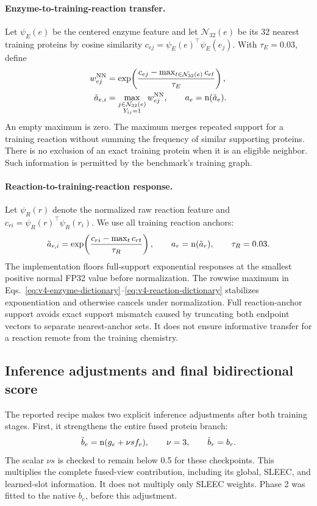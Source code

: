 \paragraph{Enzyme-to-training-reaction transfer.}
Let $\psi_E(e)$ be the centered enzyme feature and let $\mathcal N_{32}(e)$
be its 32 nearest training proteins by cosine similarity
$c_{ej}=\psi_E(e)^\top\psi_E(e_j)$. With $\tau_E=0.03$, define
\begin{align}
  w_{ej}^{\mathrm{NN}}&=
    \exp\!\left(\frac{c_{ej}-\max_{t\in\mathcal N_{32}(e)}c_{et}}{\tau_E}\right),\\
  \tilde a_{e,i}&=
    \max_{\substack{j\in\mathcal N_{32}(e)\\Y_{ij}=1}}w_{ej}^{\mathrm{NN}},
  \qquad a_e=\operatorname{n}(\tilde a_e).
  \label{eq:v4-enzyme-dictionary}
\end{align}
An empty maximum is zero. The maximum merges repeated support for a training
reaction without summing the frequency of similar supporting proteins.
There is no exclusion of an exact training protein when it is an eligible
neighbor. Such information is permitted by the benchmark's training graph.

\paragraph{Reaction-to-training-reaction response.}
Let $\psi_R(r)$ denote the normalized raw reaction feature and
$c_{ri}=\psi_R(r)^\top\psi_R(r_i)$. We use all training reaction anchors:
\begin{equation}
  \tilde a_{r,i}=\exp\!\left(
       \frac{c_{ri}-\max_t c_{rt}}{\tau_R}\right),\qquad
  a_r=\operatorname{n}(\tilde a_r),\qquad \tau_R=0.03.
  \label{eq:v4-reaction-dictionary}
\end{equation}
The implementation floors full-support exponential responses at the smallest
positive normal FP32 value before normalization. The rowwise maximum in
Eqs.~\eqref{eq:v4-enzyme-dictionary}--\eqref{eq:v4-reaction-dictionary}
stabilizes exponentiation and otherwise cancels under normalization.
Full reaction-anchor support avoids exact support mismatch caused by truncating
both endpoint vectors to separate nearest-anchor sets. It does not ensure
informative transfer for a reaction remote from the training chemistry.

\subsection{Inference adjustments and final bidirectional score}
\label{sec:v4-inference}
The reported recipe makes two explicit inference adjustments after both
training stages. First, it strengthens the entire fused protein branch:
\begin{equation}
  \tilde b_e=\operatorname{n}(g_e+\nu s f_e),\qquad \nu=3,
  \qquad \tilde b_r=b_r.
  \label{eq:v4-inference-fusion}
\end{equation}
The scalar $\nu s$ is checked to remain below 0.5 for these checkpoints.
This multiplies the complete fused-view contribution, including its global,
SLEEC, and learned-slot information. It does not multiply only SLEEC weights.
Phase 2 was fitted to the native $b_e$, before this adjustment.

